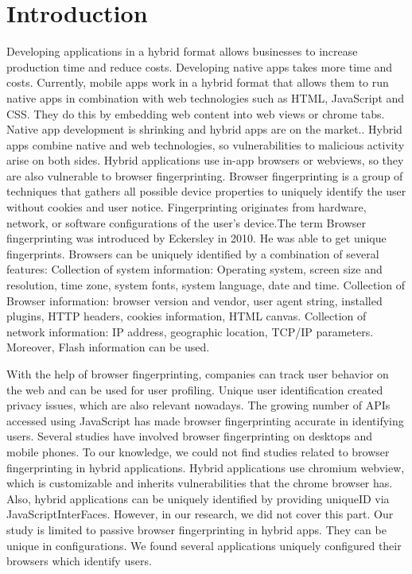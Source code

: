 \section{Introduction}

      Developing applications in a hybrid format allows businesses to increase production time and reduce costs. Developing 
native apps takes more time and costs. Currently, mobile apps work in a hybrid format that allows them to run native apps in combination with web technologies such as HTML, JavaScript and CSS. They do this by embedding web content into web views or chrome tabs\cite{webview}. Native app development is shrinking and hybrid apps are on the market.\cite{LuDroid-Journal}. Hybrid apps combine native and web technologies, so vulnerabilities to malicious activity arise on both sides\cite{LuDroid-Journal}. 
Hybrid applications use in-app browsers or webviews, so they are also vulnerable to browser fingerprinting.
Browser fingerprinting is a group of techniques that gathers all possible device properties to uniquely identify the user without cookies and user notice. Fingerprinting originates from hardware, network, or software configurations of the user's device.The term Browser fingerprinting was introduced by Eckersley\cite{eckersley2010unique} in 2010. He was able to get unique fingerprints. Browsers can be uniquely identified by a combination of several features:
Collection of system information: Operating system, screen size and resolution, time zone, system fonts, system language, date and time.
Collection of Browser information: browser version and vendor, user agent string, installed plugins, HTTP headers, cookies information, HTML canvas.
Collection of network information: IP address, geographic location, TCP/IP parameters. 
Moreover, Flash information can be used. 

With the help of browser fingerprinting, companies can track user behavior on the web\cite{nikiforakis2013cookieless}  and can be used for user profiling. 
Unique user identification created privacy issues, which are also relevant nowadays. 
The growing number of APIs accessed using JavaScript has made browser fingerprinting accurate in identifying users. Several studies have involved browser fingerprinting on desktops\cite{laperdrix2020browser} and mobile phones\cite{gomez2017fingerprinting}\cite{kurtz2016fingerprinting}\cite{oliver2018fingerprinting}. To our knowledge, we could not find studies related to browser fingerprinting in hybrid applications.
Hybrid applications use chromium webview, which is customizable and inherits vulnerabilities that the chrome browser has. Also, hybrid applications can be uniquely identified by providing uniqueID via JavaScriptInterFaces. However, in our research, we did not cover this part. 
Our study is limited to passive browser fingerprinting in hybrid apps. They can be unique in configurations. We found several applications uniquely configured their browsers which identify users.